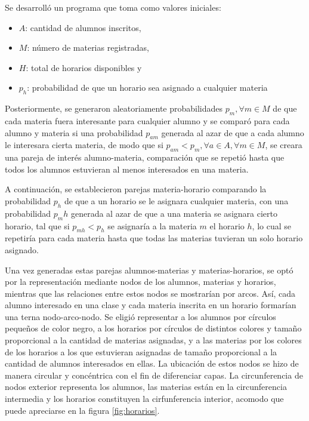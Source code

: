 \documentclass{article}
\begin{document}
  Se desarrolló un programa que toma como valores iniciales:

  \begin{itemize}
    \item $A$: cantidad de alumnos inscritos,
    \item $M$: número de materias registradas,
    \item $H$: total de horarios disponibles y
    \item $p_h$: probabilidad de que un horario sea asignado a cualquier materia
  \end{itemize}

  Posteriormente, se generaron aleatoriamente probabilidades $p_m, \forall m \in M$ de que cada materia fuera interesante para cualquier alumno y se comparó para cada alumno y materia si una probabilidad $p_{am}$ generada al azar de que a cada alumno le interesara cierta materia, de modo que si $p_{am} < p_m, \forall a \in A, \forall m \in M$, se creara una pareja de interés alumno-materia, comparación que se repetió hasta que todos los alumnos estuvieran al menos interesados en una materia.

  A continuación, se establecieron parejas materia-horario comparando la probabilidad $p_h$ de que a un horario se le asignara cualquier materia,  con una probabilidad $p_mh$ generada al azar de que a una materia se asignara cierto horario, tal que si $p_{mh} < p_h$ se asignaría a la materia $m$ el horario $h$, lo cual se repetiría para cada materia hasta que todas las materias tuvieran un solo horario asignado.

  Una vez generadas estas parejas alumnos-materias y materias-horarios, se optó por la representación mediante nodos de los alumnos, materias y horarios, mientras que las relaciones entre estos nodos se mostrarían por arcos. Así, cada alumno interesado en una clase y cada materia inscrita en un horario formarían una terna nodo-arco-nodo. Se eligió representar a los alumnos por círculos pequeños de color negro, a los horarios por círculos de distintos colores y tamaño proporcional a la cantidad de materias asignadas, y a las materias por los colores de los horarios a los que estuvieran asignadas de tamaño proporcional a la cantidad de alumnos interesados en ellas. La ubicación de estos nodos se hizo de manera circular y concéntrica con el fin de diferenciar capas. La circunferencia de nodos exterior representa los alumnos, las materias están en la circunferencia intermedia y los horarios constituyen la cirfunferencia interior, acomodo que puede apreciarse en la figura \ref{fig:horarios}.
\end{document}
